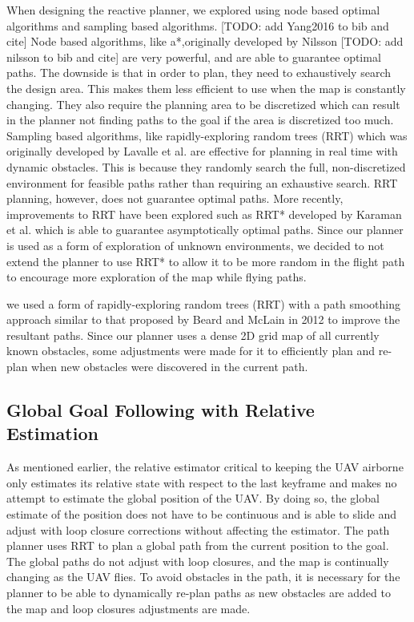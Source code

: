 \documentclass[letterpaper, 10 pt, conference]{ieeeconf}  %
\newcommand{\todo}[1]{{\color{blue}[TODO: #1]}}
\begin{document}
When designing the reactive planner, we explored using node based optimal algorithms and sampling based algorithms. \todo{add Yang2016 to bib and cite} Node based algorithms, like a*,originally developed by Nilsson \todo{add nilsson to bib and cite} are very powerful, and are able to guarantee optimal paths. The downside is that in order to plan, they need to exhaustively search the design area. This makes them less efficient to use when the map is constantly changing. They also require the planning area to be discretized which can result in the planner not finding paths to the goal if the area is discretized too much. Sampling based algorithms, like rapidly-exploring random trees (RRT) which was originally developed by Lavalle et al. \cite{Lavalle1998} are effective for planning in real time with dynamic obstacles. This is because they randomly search the full, non-discretized environment for feasible paths rather than requiring an exhaustive search. RRT planning, however, does not guarantee optimal paths. More recently, improvements to RRT have been explored such as RRT* developed by Karaman et al. \cite{Karaman2011} which is able to guarantee asymptotically optimal paths. Since our planner is used as a form of exploration of unknown environments, we decided to not extend the planner to use RRT* to allow it to be more random in the flight path to encourage more exploration of the map while flying paths.

we used a form of rapidly-exploring random trees (RRT) with a path smoothing approach similar to that proposed by Beard and McLain in 2012 \cite{Beard2012} to improve the resultant paths. Since our planner uses a dense 2D grid map of all currently known obstacles, some adjustments were made for it to efficiently plan and re-plan when new obstacles were discovered in the current path.

\subsection{Global Goal Following with Relative Estimation}

As mentioned earlier, the relative estimator critical to keeping the UAV airborne only estimates its relative state with respect to the last keyframe and makes no attempt to estimate the global position of the UAV. By doing so, the global estimate of the position does not have to be continuous and is able to slide and adjust with loop closure corrections without affecting the estimator. The path planner uses RRT to plan a global path from the current position to the goal. The global paths do not adjust with loop closures, and the map is continually changing as the UAV flies. To avoid obstacles in the path, it is necessary for the planner to be able to dynamically re-plan paths as new obstacles are added to the map and loop closures adjustments are made.
\end{document}
